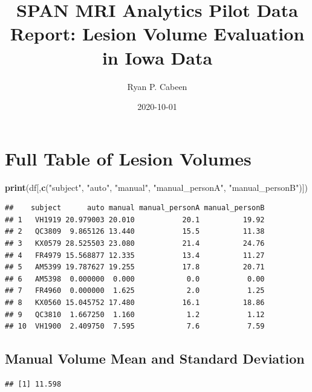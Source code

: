 \documentclass[
]{article}
\title{SPAN MRI Analytics Pilot Data Report: Lesion Volume Evaluation in Iowa
Data}
\author{Ryan P. Cabeen}
\date{2020-10-01}
\newenvironment{Shaded}{\begin{snugshade}}{\end{snugshade}}
\newcommand{\KeywordTok}[1]{\textcolor[rgb]{0.13,0.29,0.53}{\textbf{#1}}}
\newcommand{\NormalTok}[1]{#1}
\newcommand{\OperatorTok}[1]{\textcolor[rgb]{0.81,0.36,0.00}{\textbf{#1}}}
\newcommand{\StringTok}[1]{\textcolor[rgb]{0.31,0.60,0.02}{#1}}
\begin{document}
\maketitle

\hypertarget{full-table-of-lesion-volumes}{%
\section{Full Table of Lesion
Volumes}\label{full-table-of-lesion-volumes}}

\begin{Shaded}
\begin{Highlighting}[]
\KeywordTok{print}\NormalTok{(df[,}\KeywordTok{c}\NormalTok{(}\StringTok{"subject"}\NormalTok{, }\StringTok{"auto"}\NormalTok{, }\StringTok{"manual"}\NormalTok{, }\StringTok{"manual_personA"}\NormalTok{, }\StringTok{"manual_personB"}\NormalTok{)])}
\end{Highlighting}
\end{Shaded}

\begin{verbatim}
##    subject      auto manual manual_personA manual_personB
## 1   VH1919 20.979003 20.010           20.1          19.92
## 2   QC3809  9.865126 13.440           15.5          11.38
## 3   KX0579 28.525503 23.080           21.4          24.76
## 4   FR4979 15.568877 12.335           13.4          11.27
## 5   AM5399 19.787627 19.255           17.8          20.71
## 6   AM5398  0.000000  0.000            0.0           0.00
## 7   FR4960  0.000000  1.625            2.0           1.25
## 8   KX0560 15.045752 17.480           16.1          18.86
## 9   QC3810  1.667250  1.160            1.2           1.12
## 10  VH1900  2.409750  7.595            7.6           7.59
\end{verbatim}

\hypertarget{manual-volume-mean-and-standard-deviation}{%
\subsection{Manual Volume Mean and Standard
Deviation}\label{manual-volume-mean-and-standard-deviation}}

\begin{Shaded}
\end{Shaded}

\begin{verbatim}
## [1] 11.598
\end{verbatim}
\end{document}
